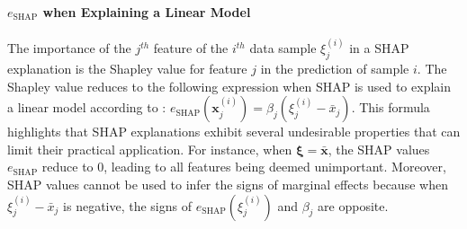 \documentclass[12pt]{article}  %
\begin{document}
\vspace{-3mm} 
     \paragraph{$e_{\text{SHAP}}$ when Explaining a Linear Model}
       The importance of the $j^{th}$ feature of the $i^{th}$ data sample $\xi^{(i)}_j$ in a SHAP explanation is the Shapley value for feature $j$ in the prediction of sample $i$. The Shapley value reduces to the following expression when SHAP is used to explain a linear model according to \cite{StrumbeljErik2014Epma,lundberg17shap}: $e_\text{SHAP}(\mathbf{x}^{(i)}_j) = \beta_j (\xi^{(i)}_j - \bar{x}_j)$. 
    This formula highlights that SHAP explanations exhibit several undesirable properties that can limit their practical application. For instance, when $\boldsymbol{\xi}=\bar{\mathbf{x}}$, the SHAP values $e_\text{SHAP}$ reduce to 0, leading to all features being deemed unimportant. Moreover, SHAP values cannot be used to infer the signs of marginal effects because when $\xi^{(i)}_j - \bar{x}_j$ is negative, the signs of $e_{\text{SHAP}}(\xi^{(i)}_j)$ and $\beta_j$ are opposite. 
       
       
\end{document}
